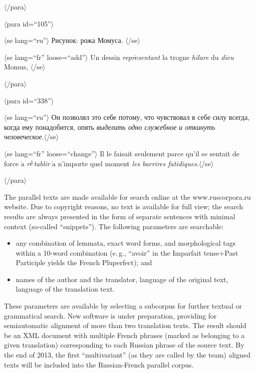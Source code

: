 \begin{multicols}{2}
     $\langle$/para$\rangle$
     
     $\langle$para id\;=\;``105''$\rangle$
     
     \hspace*{2mm}$\langle$se lang\;=\;``ru''$\rangle$ Рисунок: рожа Момуса. 
$\langle$/se$\rangle$
     
     \hspace*{2mm}$\langle$se lang\;=\;``fr'' loose\;=\;``add''$\rangle$ Un dessin 
\textit{repr$\acute{\mbox{e}}$sentant} la trogne \textit{hilare} du \textit{dieu} Momus, 
$\langle$/se$\rangle$
     
     $\langle$/para$\rangle$
     
     $\langle$para id\;=\;``338''$\rangle$
     
     \hspace*{2mm}$\langle$se lang\;=\;``ru''$\rangle$ Он позволял это себе потому, что 
чувствовал в себе силу всегда, когда ему понадобится, опять \textit{выделить одно служебное 
и откинуть человеческое}.$\langle$/se$\rangle$
     
     \hspace*{2mm}$\langle$se lang\;=\;``fr'' loose\;=\;``change''$\rangle$ Il le faisait seulement 
parce qu'il se sentait de force $\grave{\mbox{a}}$ \textit{r$\acute{\mbox{\textit{e}}}$tablir} 
$\grave{\mbox{a}}$ n'importe quel moment \textit{les barri{\!}res fatidiques}.$\langle$/se$\rangle$
     
     $\langle$/para$\rangle$
       
   The parallel texts are made available for search online at the 
   {\sf www.ruscorpora.ru} website. Due to 
copyright reasons, no text is available for full view; the search results are always presented in the 
form of separate sentences with minimal context (so-called ``snippets''). The following parameters 
are searchable:
   \begin{itemize}
\item any combination of lemmata, exact word forms, and morphological tags within a 
10-word combination (e.\,g., ``avoir'' in the Imparfait tense\;+\;Past Participle yields the French 
Pluperfect); and
\item names of the author and the translator, language of the original text, language of the 
translation text.
\end{itemize}
   
   These parameters are available by selecting a subcorpus for further textual or grammatical 
search. New software is under preparation, providing for semiautomatic alignment of more than two 
translation texts. The result should be an XML document with multiple French phrases (marked as 
belonging to a given translation) corresponding to each Russian phrase of the source text. By the 
end of 2013, the first ``multivariant'' (as they are called by the team) aligned texts will be included 
into the Russian-French parallel corpus.
   

\end{multicols}
